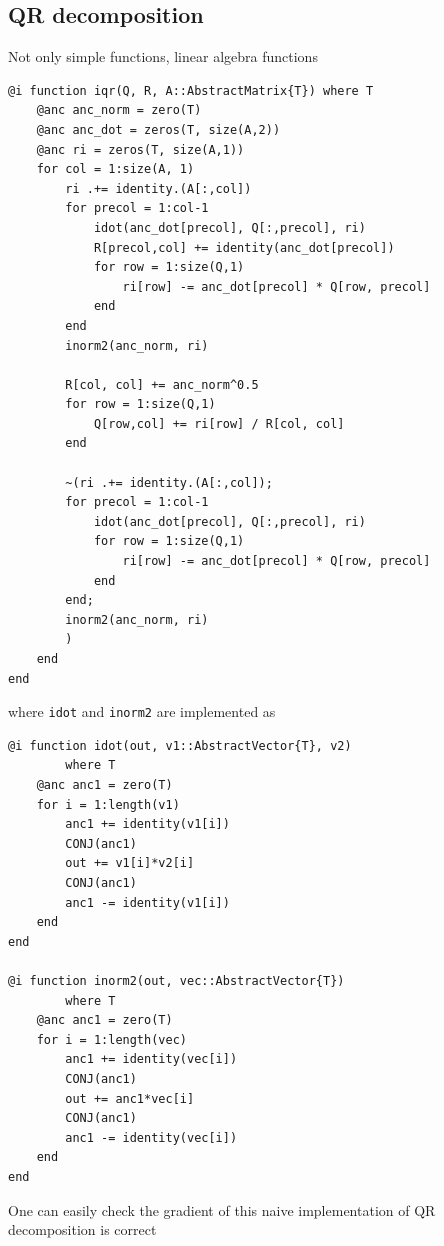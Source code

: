 \documentclass[aps,twocolumn,longbibliography,english,superscriptaddress,prr]{revtex4-1}
\newcommand{\<}{\langle}
\renewcommand{\>}{\rangle}
\theoremstyle{definition}\newtheorem{definition}{\textit{Definition}}
\begin{document}
\subsection{QR decomposition}

Not only simple functions, linear algebra functions 

\begin{minipage}{.44\textwidth}
\begin{lstlisting}
@i function iqr(Q, R, A::AbstractMatrix{T}) where T
    @anc anc_norm = zero(T)
    @anc anc_dot = zeros(T, size(A,2))
    @anc ri = zeros(T, size(A,1))
    for col = 1:size(A, 1)
        ri .+= identity.(A[:,col])
        for precol = 1:col-1
            idot(anc_dot[precol], Q[:,precol], ri)
            R[precol,col] += identity(anc_dot[precol])
            for row = 1:size(Q,1)
                ri[row] -= anc_dot[precol] * Q[row, precol]
            end
        end
        inorm2(anc_norm, ri)

        R[col, col] += anc_norm^0.5
        for row = 1:size(Q,1)
            Q[row,col] += ri[row] / R[col, col]
        end

        ~(ri .+= identity.(A[:,col]);
        for precol = 1:col-1
            idot(anc_dot[precol], Q[:,precol], ri)
            for row = 1:size(Q,1)
                ri[row] -= anc_dot[precol] * Q[row, precol]
            end
        end;
        inorm2(anc_norm, ri)
        )
    end
end
\end{lstlisting}
\end{minipage}

where \texttt{idot} and \texttt{inorm2} are implemented as

\begin{minipage}{.44\textwidth}
\begin{lstlisting}
@i function idot(out, v1::AbstractVector{T}, v2)
        where T
    @anc anc1 = zero(T)
    for i = 1:length(v1)
        anc1 += identity(v1[i])
        CONJ(anc1)
        out += v1[i]*v2[i]
        CONJ(anc1)
        anc1 -= identity(v1[i])
    end
end

@i function inorm2(out, vec::AbstractVector{T})
        where T
    @anc anc1 = zero(T)
    for i = 1:length(vec)
        anc1 += identity(vec[i])
        CONJ(anc1)
        out += anc1*vec[i]
        CONJ(anc1)
        anc1 -= identity(vec[i])
    end
end
\end{lstlisting}
\end{minipage}

One can easily check the gradient of this naive implementation of QR decomposition is correct
\end{document}

